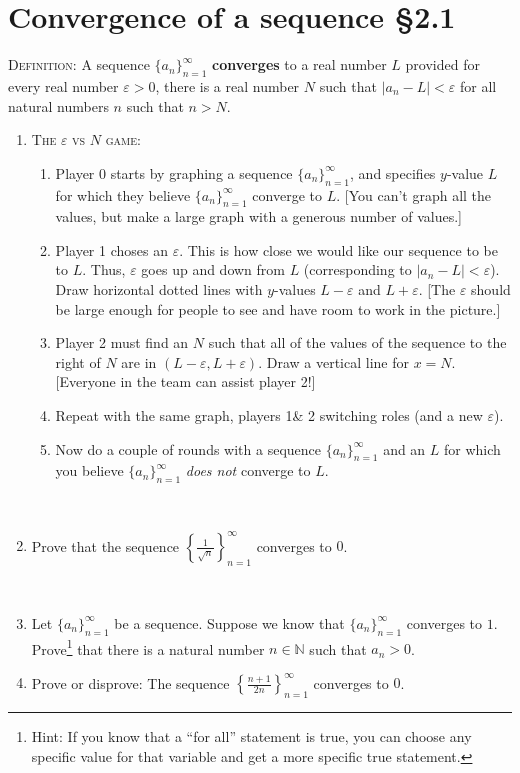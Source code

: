 \documentclass[12pt]{amsart}
\newcommand{\N}{\mathbb{N}}
\newcommand{\e}{\varepsilon}
\begin{document}
	
	\thispagestyle{empty}
	
	\section*{Convergence of a sequence \S2.1}
	
	

\begin{framed}
\noindent \textsc{Definition:} A sequence $\{a_n\}_{n=1}^\infty$ {\bf converges} to a real number $L$ provided for every real number $\e > 0$, there is a real number $N$ such that ${|a_n - L| < \e}$ for all natural numbers $n$ such that $n > N$.
\end{framed}
\begin{enumerate}
\item \textsc{The $\e$ vs $N$ game:}
\begin{enumerate}
\item Player 0 starts by graphing a sequence $\{a_n\}_{n=1}^\infty$, and specifies $y$-value $L$ for which they believe  $\{a_n\}_{n=1}^\infty$ converge to $L$. [You can't graph all the values, but make a large graph with a generous number of values.]
\item Player 1 choses an $\e$. This is how close we would like our sequence to be to $L$. Thus, $\e$ goes up and down from $L$ (corresponding to $|a_n-L|<\e$). Draw horizontal dotted lines with $y$-values $L-\e$ and $L+\e$. [The $\e$ should be large enough for people to see and have room to work in the picture.]
\item Player 2 must find an $N$ such that all of the values of the sequence to the right of $N$ are in $(L-\e,L+\e)$.
Draw a vertical line for $x=N$.
[Everyone in the team can assist player 2!]
\item Repeat with the same graph, players 1\& 2 switching roles (and a new $\e$).
\item Now do a couple of rounds with a sequence $\{a_n\}_{n=1}^\infty$ and an $L$ for which you believe  $\{a_n\}_{n=1}^\infty$ \emph{does not} converge to $L$.\end{enumerate}

\

\item Prove that the sequence $ \left\{ \frac{1}{\sqrt{n}} \right\}_{n=1}^\infty$ converges to $0$.


\

\item Let $\{a_n\}_{n=1}^\infty$ be a sequence. Suppose we know that $\{a_n\}_{n=1}^\infty$ converges to $1$. Prove\footnote{Hint: If you know that a ``for all'' statement is true, you can choose any specific value for that variable and get a more specific true statement.} that there is a natural number $n\in \N$ such that $a_n>0$.





\item Prove or disprove: The sequence $ \left\{\frac{n+1}{2n} \right\}_{n=1}^\infty$ converges to $0$.



\end{enumerate}
\end{document}
